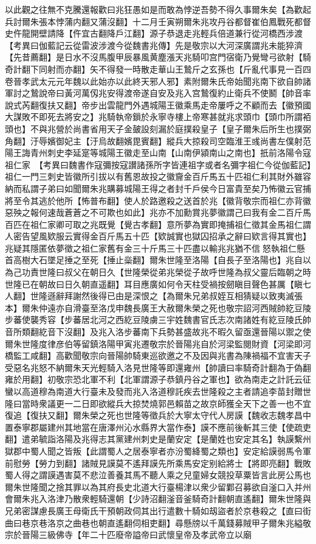 以此觀之往無不克騰還報歡曰兆狂愚如是而敢為悖逆吾勢不得久事爾朱矣【為歡起兵討爾朱張本悖蒲内翻又蒲沒翻】十二月壬寅朔爾朱兆攻丹谷都督崔伯鳳戰死都督史仵龍開壁請降【仵宜古翻降戶江翻】源子恭退走兆輕兵倍道兼行從河橋西涉渡　【考異曰伽藍記云從雷波涉渡今從魏書兆傳】先是敬宗以大河深廣謂兆未能猝濟【先昔薦翻】是日水不沒馬腹甲辰暴風黄塵漲天兆騎叩宫門宿衛乃覺彎弓欲射【騎奇計翻下同射而亦翻】矢不得發一時散走華山王鷙斤之玄孫也【斤亂代事見一百四卷晉孝武太元元年魏以此始亦以此終天邪人邪】素附爾朱氏帝始聞兆南下欲自帥諸軍討之鷙說帝曰黃河萬仭兆安得渡帝遂自安及兆入宫鷙復約止衛兵不使鬭【帥音率說式芮翻復扶又翻】帝步出雲龍門外遇城陽王徽乘馬走帝屢呼之不顧而去【徽預國大謀敗不即死去將安之】兆騎執帝鎻於永寧寺樓上帝寒甚就兆求頭巾【頭巾所謂袹頭也】不與兆營於尚書省用天子金皷設刻漏於庭撲殺皇子【皇子爾朱后所生也撲弼角翻】汙辱嬪御妃主【汙烏故翻嬪毘賓翻】縱兵大掠殺司空臨淮王彧尚書左僕射范陽王誨青州刺史李延寔等城陽王徽走至山南【山南伊潁南山之南也】扺前洛陽令寇祖仁家　【考異曰魏書作寇彌按寇讃諸孫所字皆連祖字或者名彌字祖仁今從伽藍記】祖仁一門三刺史皆徽所引拔以有舊恩故投之徽齎金百斤馬五十匹祖仁利其財外雖容納而私謂子弟曰如聞爾朱兆購募城陽王得之者封千戶侯今日富貴至矣乃怖徽云官捕將至令其逃於他所【怖普布翻】使人於路邀殺之送首於兆【徽背敬宗而祖仁亦背徽惡殃之報何速哉蒼蒼之不可欺也如此】兆亦不加勳賞兆夢徽謂己曰我有金二百斤馬百匹在祖仁家卿可取之兆既覺【覺古孝翻】意所夢為實即掩捕祖仁徵其金馬祖仁謂人密告望風欵服云實得金百斤馬五十匹【欵誠實也獄囚招承之辭曰欵言得其實也】兆疑其隱匿依夢徵之祖仁家舊有金三十斤馬三十匹盡以輸兆兆猶不信怒執祖仁懸首高樹大石墜足捶之至死【捶止橤翻】爾朱世隆至洛陽【自長子至洛陽也】兆自以為己功責世隆曰叔父在朝日久【世隆榮從弟兆榮從子故呼世隆為叔父靈后臨朝之時世隆已在朝故曰日久朝直遥翻】耳目應廣如何令天柱受禍按劒瞋目聲色甚厲【瞋七人翻】世隆遜辭拜謝然後得已由是深恨之【為爾朱兄弟叔姪互相猜疑以致夷滅張本】爾朱仲遠亦自滑臺至洛戊申魏長廣王大赦爾朱榮之死也敬宗詔河西賊帥紇豆陵步蕃使襲秀容【步蕃居北河之西紇豆陵虜三宇姓魏書官氏志次南諸姓有紇豆陵氏帥音所類翻紇音下沒翻】及兆入洛步蕃南下兵勢甚盛故兆不暇久留亟還晉陽以禦之使爾朱世隆度律彦伯等留鎮洛陽甲寅兆遷敬宗於晉陽兆自於河梁監閱財資【河梁即河橋監工咸翻】高歡聞敬宗向晉陽帥騎東巡欲邀之不及因與兆書為陳禍福不宜害天子受惡名兆怒不納爾朱天光輕騎入洛見世隆等即還雍州【帥讀曰率騎奇計翻為于偽翻雍於用翻】初敬宗恐北軍不利【北軍謂源子恭鎮丹谷之軍也】欲為南走之計託云征蠻以高道穆為南道大行臺未及發而兆入洛道穆託疾去世隆殺之主者請追李苗封贈世隆曰當時衆議更一二日即欲縱兵大掠焚燒郭邑賴苗之故京師獲全天下之善一也不宜復追【復扶又翻】爾朱榮之死也世隆等徵兵於大寧太守代人房謨【魏收志魏孝昌中置泰寧郡屬建州其地當在唐澤州沁水縣界大當作泰】謨不應前後斬其三使【使疏吏翻】遣弟毓詣洛陽及兆得志其黨建州刺史是蘭安定【是蘭姓也安定其名】執謨繫州獄郡中蜀人聞之皆叛【此謂蜀人之居泰寧者亦汾蜀絳蜀之類也】安定給謨弱馬令軍前慰勞【勞力到翻】諸賊見謨莫不遙拜謨先所乘馬安定别給將士【將即亮翻】戰敗蜀人得之謂謨遇害莫不悲泣善養其馬不聽人乘之兒童婦女競投草粟皆言此房公馬也爾朱世隆聞之捨其罪以為其府長史北道大行臺楊津以衆少留鄴召募欲自滏口入并州會爾朱兆入洛津乃散衆輕騎還朝【少詩沼翻滏音釜騎奇計翻朝直遙翻】爾朱世隆與兄弟密謀慮長廣王母衛氏干預朝政伺其出行遣數十騎如刼盜者於京巷殺之【直曰街曲曰巷京巷洛京之曲巷也朝直遙翻伺相吏翻】尋懸牓以千萬錢募賊甲子爾朱兆縊敬宗於晉陽三級佛寺【年二十匹廢帝謚帝曰武懷皇帝及孝武帝立以廟